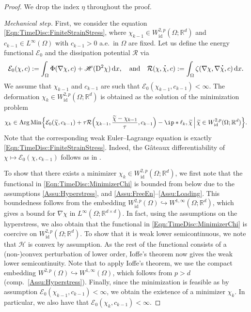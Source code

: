 \documentclass[a4paper,12pt]{article}
\newcommand{\R}{\mathbb{R}}
\newcommand{\wt}{\widetilde}
\newcommand{\dx}{\mathrm{\,d}x}
\newcommand{\id}{\mathrm{id}}
\newcommand{\Argmin}{\mathrm{Arg\,Min}}
\newcommand\DT[1]{\mathchoice
                 {{\buildrel{\hspace*{.1em}\text{\LARGE.}}\over{#1}}}
                 {{\buildrel{\hspace*{.1em}\text{\Large.}}\over{#1}}}
                 {{\buildrel{\hspace*{.1em}\text{\large.}}\over{#1}}}
                 {{\buildrel{\hspace*{.1em}\text{\large.}}\over{#1}}}}
\renewcommand{\dot}{\DT}
\newcommand{\calE}{\mathcal{E}}
\newcommand{\calR}{\mathcal{R}}
\newcommand{\rmD}{\mathrm{D}}
\theoremstyle{plain}
\theoremstyle{definition}
\numberwithin{equation}{section}
\begin{document}
\begin{proof} We drop the index $\eta$ throughout the proof.


\textit{Mechanical step.} First, we consider the equation  \eqref{Eqn:TimeDisc:FiniteStrainStress}, where $\chi_{k-1}\in W^{2,p}_\id(\Omega;\R^d)$ and $c_{k-1}\in L^{\infty}(\Omega)$ with $c_{k-1}>0$ 
a.e.\ in $\Omega$ are fixed. 
Let us define the energy functional $\calE_0$ and the dissipation potential $\calR$ via
\[
\calE_0(\chi,c) := \int_\Omega \Phi(\nabla\chi,c)+\mathscr{H}(\rmD^2\chi)\dx,
\quad\text{and}\quad
\calR(\chi,\dot\chi,c) := \int_\Omega \zeta(\nabla\chi,\nabla\dot\chi,c)\dx.
\]
We assume that $\chi_{k-1}$ and $c_{k-1}$ are such that $\calE_0(\chi_{k-1},c_{k-1})<\infty$.
The deformation $\chi_k\in W^{2,p}_\id(\Omega;\R^d)$ is obtained
as the solution of the minimization problem 
\begin{equation}
\label{Eqn:TimeDisc:MinimizerChi}
\chi_k \in \Argmin\Big\{ \mathcal{E}_0(\wt\chi,c_{k-1}) + \tau\calR\Big(\chi_{k-1},\frac{\wt\chi-\chi_{k-1}}{\tau},c_{k-1}\Big) - \ip*{\ell_k,\wt\chi} \,\Big|\,\wt{\chi}\in W^{2,p}_\id(\Omega;\R^d)\Big\}.
\end{equation} 
Note that the corresponding weak Euler--Lagrange equation 
is exactly \eqref{Eqn:TimeDisc:FiniteStrainStress}. Indeed, the G\^ateaux differentiability
of $\chi \mapsto \calE_0(\chi,c_{k-1})$ follows as in \cite[Proposition 3.2]{MieRou2020TVKVR}.

To show that there exists a minimizer $\chi_k\in W^{2,p}_\id(\Omega;\R^d)$, we first note that the functional in \eqref{Eqn:TimeDisc:MinimizerChi} is bounded from below due to the assumptions \ref{Assu:Hyperstress}, and \ref{Assu:FreeEn}--\ref{Assu:Loading}. This boundedness follows from the embedding $W^{2,p}_\id(\Omega)\hookrightarrow W^{1,\infty}(\Omega;\R^d)$, which gives a bound for $\nabla\chi$ in $L^\infty(\Omega;\R^{d\times d})$. %
In fact, using the assumptions on the hyperstress, we also obtain that the functional in \eqref{Eqn:TimeDisc:MinimizerChi} is coercive on $W^{2,p}_\id(\Omega;\R^d)$. To show that it is weak lower semicontinuous, we note that $\mathscr{H}$ is convex by assumption. As the rest of the functional consists of a (non-)convex perturbation of lower order, Ioffe's theorem \cite[Theorem 7.5]{FonLeo2007MMCV} now gives the weak lower semicontinuity. Note that to apply Ioffe's theorem, we use the compact embedding $W^{2,p}(\Omega)\hookrightarrow W^{1,\infty}(\Omega)$, which follows from $p>d$ (comp.\ \ref{Assu:Hyperstress}). Finally, since the minimization is feasible as by assumption  $\calE_0(\chi_{k-1},c_{k-1})<\infty$, we obtain the existence of a minimizer $\chi_k$. In particular, we also have that $\calE_0(\chi_{k},c_{k-1})<\infty$.
\medskip


\end{proof}
\end{document}
